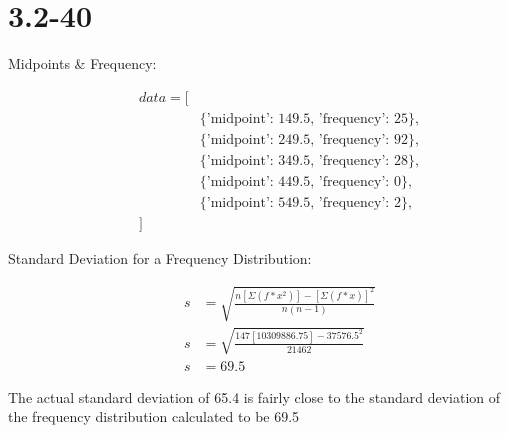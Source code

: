 \documentclass[12pt,fleqn]{article}
\newcommand{\chapter}{3.2}
\newcommand{\problem}[1]{\vspace{5ex}\section*{\chapter-#1}}
\begin{document}
\problem{40}
\begin{description}
\item[Midpoints \& Frequency:]
  \begin{align*}
    data = [ \\
      &\{\text{'midpoint': 149.5, 'frequency': 25\}}, \\
      &\{\text{'midpoint': 249.5, 'frequency': 92\}}, \\
      &\{\text{'midpoint': 349.5, 'frequency': 28\}}, \\
      &\{\text{'midpoint': 449.5, 'frequency': 0\}}, \\
      &\{\text{'midpoint': 549.5, 'frequency': 2\}}, \\
    ]
  \end{align*}

\item[Standard Deviation for a Frequency Distribution:]
  \begin{align*}
    s &= \sqrt{\frac{n[\Sigma(f * x^2)] - [\Sigma(f * x)]^2}{n(n-1)}} \\
    s &= \sqrt{\frac{147[10309886.75] - 37576.5^2}{21462}} \\
    s &= 69.5
  \end{align*}

\end{description}
The actual standard deviation of 65.4 is fairly close to the standard deviation of the frequency distribution calculated to be 69.5
\end{document}
